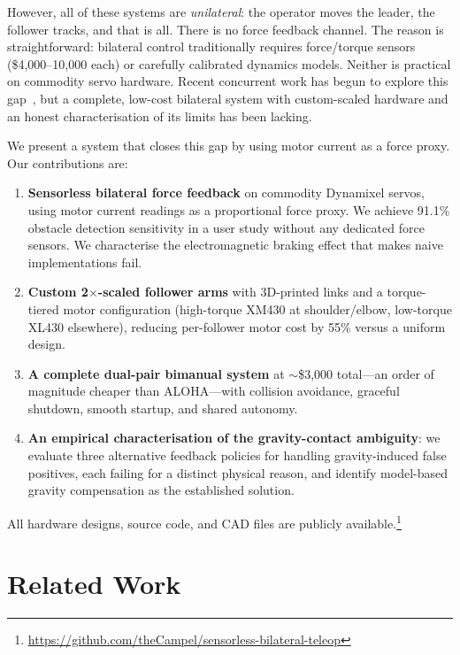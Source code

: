 \documentclass[conference]{IEEEtran}
\begin{document}
However, all of these systems are \emph{unilateral}: the operator moves the leader, the follower tracks, and that is all. There is no force feedback channel. The reason is straightforward: bilateral control traditionally requires force/torque sensors (\$4,000--10,000 each) or carefully calibrated dynamics models. Neither is practical on commodity servo hardware. Recent concurrent work has begun to explore this gap~\cite{echo2025, sujit_2025_improving, kobayashi2024, kanai2025}, but a complete, low-cost bilateral system with custom-scaled hardware and an honest characterisation of its limits has been lacking.

We present a system that closes this gap by using motor current as a force proxy. Our contributions are:

\begin{enumerate}
    \item \textbf{Sensorless bilateral force feedback} on commodity Dynamixel servos, using motor current readings as a proportional force proxy. We achieve 91.1\% obstacle detection sensitivity in a user study without any dedicated force sensors. We characterise the electromagnetic braking effect that makes naive implementations fail.

    \item \textbf{Custom 2$\times$-scaled follower arms} with 3D-printed links and a torque-tiered motor configuration (high-torque XM430 at shoulder/elbow, low-torque XL430 elsewhere), reducing per-follower motor cost by 55\% versus a uniform design.

    \item \textbf{A complete dual-pair bimanual system} at $\sim$\$3,000 total---an order of magnitude cheaper than ALOHA---with collision avoidance, graceful shutdown, smooth startup, and shared autonomy.

    \item \textbf{An empirical characterisation of the gravity-contact ambiguity}: we evaluate three alternative feedback policies for handling gravity-induced false positives, each failing for a distinct physical reason, and identify model-based gravity compensation as the established solution.
\end{enumerate}

All hardware designs, source code, and CAD files are publicly available.\footnote{\url{https://github.com/theCampel/sensorless-bilateral-teleop}}

\section{Related Work}
\end{document}
